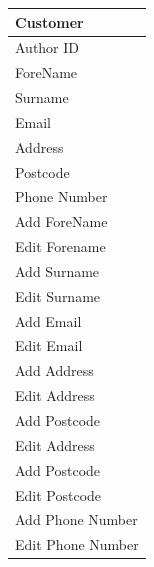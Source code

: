 \begin{tabular}{|p{2.5cm}|}
    \hline
    \textbf{Customer} \\ \hline
    Author ID \\ ForeName \\ Surname \\ Email \\ Address \\ Postcode \\ Phone Number \\ \hline
    Add ForeName \\ Edit Forename \\ Add Surname \\ Edit Surname \\ Add Email \\ Edit Email \\ Add Address \\ Edit Address \\ Add Postcode \\ Edit Address \\ Add Postcode \\ Edit Postcode \\ Add Phone Number \\ Edit Phone Number \\ \hline
    \hline
\end{tabular}


